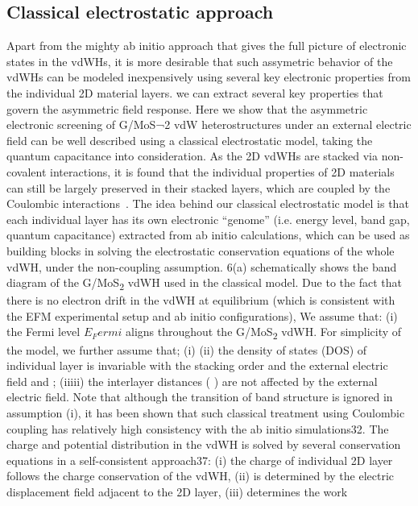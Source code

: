\subsection{Classical electrostatic approach}
\label{sec:asym-classic}
Apart from the mighty ab initio approach that gives the full picture
of electronic states in the vdWHs, it is more desirable that such
assymetric behavior of the vdWHs can be modeled inexpensively using
several key electronic properties from the individual 2D material
layers. we can extract several key properties that govern the
asymmetric field response. Here we show that the asymmetric electronic
screening of G/MoS¬2 vdW heterostructures under an external electric
field can be well described using a classical electrostatic model,
taking the quantum capacitance into
consideration\cite{Luryi_1988_Quantum}. As the 2D vdWHs are stacked
via non-covalent interactions, it is found that the individual
properties of 2D materials can still be largely preserved in their
stacked layers, which are coupled by the Coulombic
interactions~\citeauthor{Andersen_2015_dielec_vdWH}.
%
The idea behind our classical electrostatic model is that each
individual layer has its own electronic “genome” (i.e. energy level,
band gap, quantum capacitance) extracted from ab initio calculations,
which can be used as building blocks in solving the electrostatic
conservation equations of the whole vdWH, under the non-coupling
assumption.  6(a) schematically shows the band diagram of the
G/MoS\textsubscript{2} vdWH used in the classical model. Due to the fact that there is
no electron drift in the vdWH at equilibrium (which is consistent with
the EFM experimental setup and ab initio configurations), We assume
that: (i) the Fermi level $E_Fermi$ aligns throughout the G/MoS\textsubscript{2}
vdWH. For simplicity of the model, we further assume that; (i) (ii)
the density of states (DOS) of individual layer is invariable with the
stacking order and the external electric field and ; (iiiii) the
interlayer distances ( ) are not affected by the external electric
field. Note that although the transition of band structure is ignored
in assumption (i), it has been shown that such classical treatment
using Coulombic coupling has relatively high consistency with the ab
initio simulations32. The charge and potential distribution in the
vdWH is solved by several conservation equations in a self-consistent
approach37: (i) the charge of individual 2D layer follows the charge
conservation of the vdWH, (ii) is determined by the electric
displacement field adjacent to the 2D layer, (iii) determines the work
